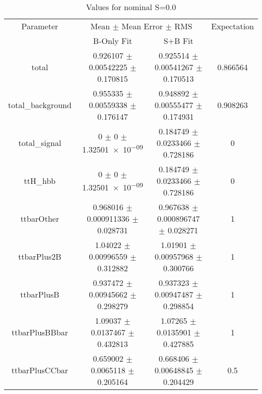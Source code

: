 \begin{table}
\centering
\caption{Values for nominal S=0.0}
\begin{tabular}{cccc}
\toprule
Parameter & \multicolumn{2}{c}{Mean $\pm$ Mean Error $\pm$ RMS} & Expectation\\
 & B-Only Fit & S+B Fit & \\
\midrule
total & \num{0.926107} $\pm$ \num{0.00542225} $\pm$ \num{0.170815} & \num{0.925514} $\pm$ \num{0.00541267} $\pm$ \num{0.170513} & \num{0.866564}\\
total\_background & \num{0.955335} $\pm$ \num{0.00559338} $\pm$ \num{0.176147} & \num{0.948892} $\pm$ \num{0.00555477} $\pm$ \num{0.174931} & \num{0.908263}\\
total\_signal & \num{0} $\pm$ \num{0} $\pm$ \num{1.32501e-09} & \num{0.184749} $\pm$ \num{0.0233466} $\pm$ \num{0.728186} & \num{0}\\
ttH\_hbb & \num{0} $\pm$ \num{0} $\pm$ \num{1.32501e-09} & \num{0.184749} $\pm$ \num{0.0233466} $\pm$ \num{0.728186} & \num{0}\\
ttbarOther & \num{0.968016} $\pm$ \num{0.000911336} $\pm$ \num{0.028731} & \num{0.967638} $\pm$ \num{0.000896747} $\pm$ \num{0.028271} & \num{1}\\
ttbarPlus2B & \num{1.04022} $\pm$ \num{0.00996559} $\pm$ \num{0.312882} & \num{1.01901} $\pm$ \num{0.00957968} $\pm$ \num{0.300766} & \num{1}\\
ttbarPlusB & \num{0.937472} $\pm$ \num{0.00945662} $\pm$ \num{0.298279} & \num{0.937323} $\pm$ \num{0.00947487} $\pm$ \num{0.298854} & \num{1}\\
ttbarPlusBBbar & \num{1.09037} $\pm$ \num{0.0137467} $\pm$ \num{0.432813} & \num{1.07265} $\pm$ \num{0.0135901} $\pm$ \num{0.427885} & \num{1}\\
ttbarPlusCCbar & \num{0.659002} $\pm$ \num{0.0065118} $\pm$ \num{0.205164} & \num{0.668406} $\pm$ \num{0.00648845} $\pm$ \num{0.204429} & \num{0.5}\\
\bottomrule
\end{tabular}
\end{table}